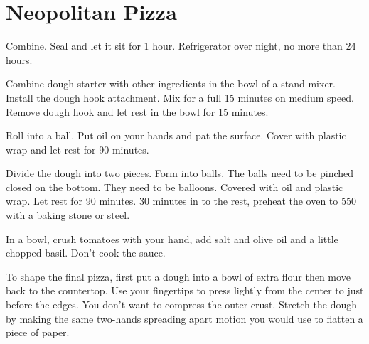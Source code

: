 \section{Neopolitan Pizza}
\begin{recipe}



Combine. Seal and let it sit for 1 hour. Refrigerator over night, no more than 24 hours. 


Combine dough starter with other ingredients in the bowl of a stand mixer. Install the dough hook attachment. Mix for a full 15 minutes on medium speed. Remove dough hook and let rest in the bowl for 15 minutes. 

Roll into a ball. Put oil on your hands and pat the surface. Cover with plastic wrap and let rest for 90 minutes. 

Divide the dough into two pieces. Form into balls. The balls need to be pinched closed on the bottom. They need to be balloons. Covered with oil and plastic wrap. Let rest for 90 minutes. 30 minutes in to the rest, preheat the oven to 550\degree{} with a baking stone or steel. 


In a bowl, crush tomatoes with your hand, add salt and olive oil and a little chopped basil. Don't cook the sauce.

To shape the final pizza, first put a dough into a bowl of extra flour then move back to the countertop. 
Use your fingertips to press lightly from the center to just before the edges. You don't want to compress the outer crust.
Stretch the dough by making the same two-hands spreading apart motion you would use to flatten a piece of paper. 


\end{recipe}
